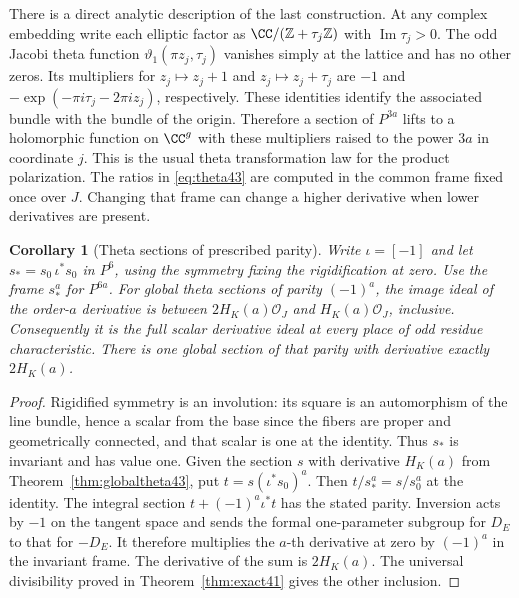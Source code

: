 \documentclass[a4paper,11pt]{article}
\newtheorem{corollary}[proposition]{Corollary}
\theoremstyle{definition}
\theoremstyle{remark}
\newcommand{\ZZ}{\mathbb Z}\newcommand{\ord}{\operatorname{ord}}
\numberwithin{equation}{section}
\newcommand{\OO}{\mathcal O}
\begin{document}
There is a direct analytic description of the last construction. At any complex embedding write each elliptic factor as \(\CC/(\ZZ+\tau_j\ZZ)\) with \(\operatorname{Im}\tau_j>0\). The odd Jacobi theta function \(\vartheta_1(\pi z_j,\tau_j)\) vanishes simply at the lattice and has no other zeros. Its multipliers for \(z_j\mapsto z_j+1\) and \(z_j\mapsto z_j+\tau_j\) are \(-1\) and \(-\exp(-\pi i\tau_j-2\pi iz_j)\), respectively. These identities identify the associated bundle with the bundle of the origin. Therefore a section of \(P^{3a}\) lifts to a holomorphic function on \(\CC^g\) with these multipliers raised to the power \(3a\) in coordinate \(j\). This is the usual theta transformation law for the product polarization. The ratios in \eqref{eq:theta43} are computed in the common frame fixed once over \(J\). Changing that frame can change a higher derivative when lower derivatives are present. \cite{XIII-X-IV-nist43}

\begin{corollary}[Theta sections of prescribed parity]\label{cor:parity43}
Write \(\iota=[-1]\) and let \(s_*=s_0\,\iota^*s_0\) in \(P^6\), using the symmetry fixing the rigidification at zero. Use the frame \(s_*^a\) for \(P^{6a}\). For global theta sections of parity \((-1)^a\), the image ideal of the order-\(a\) derivative is between \(2H_K(a)\OO_J\) and \(H_K(a)\OO_J\), inclusive. Consequently it is the full scalar derivative ideal at every place of odd residue characteristic. There is one global section of that parity with derivative exactly \(2H_K(a)\).
\end{corollary}
\begin{proof}
Rigidified symmetry is an involution: its square is an automorphism of the line bundle, hence a scalar from the base since the fibers are proper and geometrically connected, and that scalar is one at the identity. Thus \(s_*\) is invariant and has value one. Given the section \(s\) with derivative \(H_K(a)\) from Theorem~\ref{thm:globaltheta43}, put \(t=s(\iota^*s_0)^a\). Then \(t/s_*^a=s/s_0^a\) at the identity. The integral section \(t+(-1)^a\iota^*t\) has the stated parity. Inversion acts by \(-1\) on the tangent space and sends the formal one-parameter subgroup for \(D_E\) to that for \(-D_E\). It therefore multiplies the \(a\)-th derivative at zero by \((-1)^a\) in the invariant frame. The derivative of the sum is \(2H_K(a)\). The universal divisibility proved in Theorem~\ref{thm:exact41} gives the other inclusion.
\end{proof}
\end{document}
